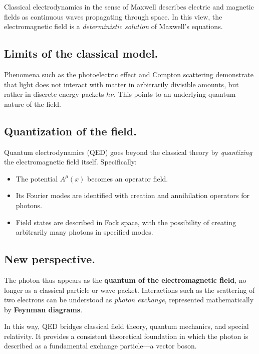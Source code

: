 Classical electrodynamics in the sense of Maxwell describes electric and 
magnetic fields as continuous waves propagating through space. 
In this view, the electromagnetic field is a 
\emph{deterministic solution} of Maxwell’s equations.

\subsection*{Limits of the classical model.}
Phenomena such as the photoelectric effect and Compton scattering
demonstrate that light does not interact with matter in arbitrarily divisible amounts, 
but rather in discrete energy packets \( h\nu \). 
This points to an underlying quantum nature of the field.

\subsection*{Quantization of the field.}
Quantum electrodynamics (QED) goes beyond the classical theory by 
\emph{quantizing} the electromagnetic field itself. Specifically:
\begin{itemize}
	\item The potential \( A^\mu(x) \) becomes an operator field.
	\item Its Fourier modes are identified with creation and annihilation operators 
	for photons.
	\item Field states are described in Fock space, 
	with the possibility of creating arbitrarily many photons in specified modes.
\end{itemize}

\subsection*{New perspective.}
The photon thus appears as the \textbf{quantum of the electromagnetic field}, 
no longer as a classical particle or wave packet. 
Interactions such as the scattering of two electrons can be understood as 
\emph{photon exchange}, represented mathematically by \textbf{Feynman diagrams}. 

\medskip
In this way, QED bridges classical field theory, quantum mechanics, and special relativity. 
It provides a consistent theoretical foundation in which the photon is described as a 
fundamental exchange particle—a vector boson.

